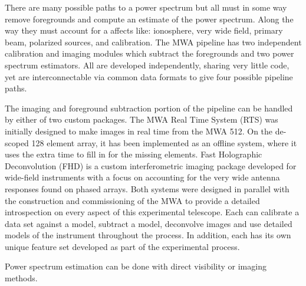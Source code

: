   There are many possible paths to a power spectrum but all must in some way remove foregrounds and compute an estimate of the power spectrum. Along the way they must account for a affects like: ionosphere, very wide field, primary beam, polarized sources, and calibration. The MWA pipeline has two independent calibration and imaging modules which subtract the foregrounds and two power spectrum estimators. All are developed independently, sharing very little code, yet are interconnectable via common data formats to give four possible pipeline paths.

The imaging and foreground subtraction portion of the pipeline can be handled by either of two custom packages.  The MWA Real Time System (RTS) was initially designed to make images in real time from the MWA 512.  On the de-scoped 128 element array, it has been implemented as an offline system, where it uses the extra time to fill in for the missing elements.  Fast Holographic Deconvolution (FHD) is a custom interferometric imaging package developed for wide-field instruments with a focus on accounting for the very wide antenna responses found on phased arrays.  Both systems were designed in parallel with the construction and commissioning of the MWA to provide a detailed introspection on every aspect of this experimental telescope. Each can calibrate a data set against a model, subtract a model, deconvolve images and use detailed models of the instrument throughout the process.  In addition, each has its own unique feature set developed as part of the experimental process.

Power spectrum estimation can be done with direct visibility or imaging methods.